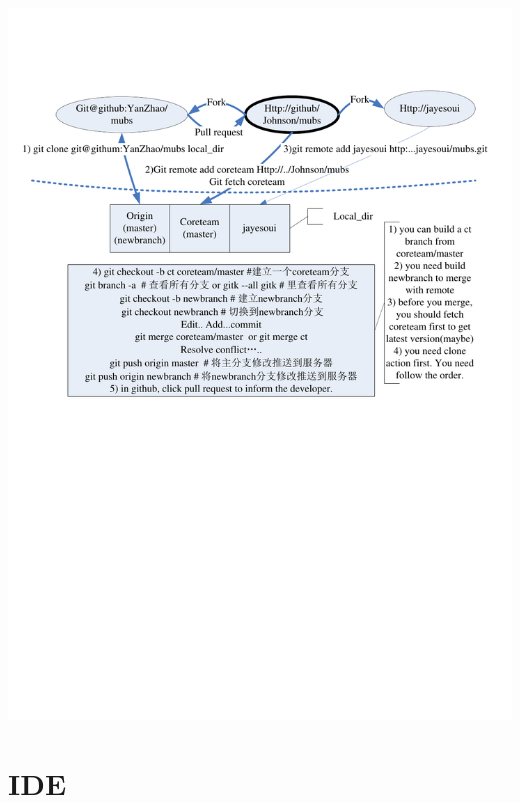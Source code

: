 \documentclass[a4paper,11pt,twoside]{book}
\begin{document}
    \includegraphics[scale=0.7]{pics/Visio-git_cooperate}



\section{IDE}
\end{document}
